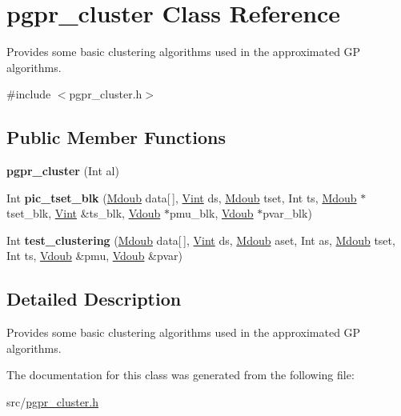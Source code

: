 \hypertarget{classpgpr__cluster}{\section{pgpr\-\_\-cluster Class Reference}
\label{classpgpr__cluster}
}


Provides some basic clustering algorithms used in the approximated G\-P algorithms.  




{\ttfamily \#include $<$pgpr\-\_\-cluster.\-h$>$}

\subsection*{Public Member Functions}
\begin{DoxyCompactItemize}
\item 
\hypertarget{classpgpr__cluster_abcc2777420420d1773d094ad9b5212b8}{{\bfseries pgpr\-\_\-cluster} (Int al)}\label{classpgpr__cluster_abcc2777420420d1773d094ad9b5212b8}

\item 
\hypertarget{classpgpr__cluster_aeceb942904a50b4b42942b012ec80e47}{Int {\bfseries pic\-\_\-tset\-\_\-blk} (\hyperlink{classpgpr__matrix}{Mdoub} data\mbox{[}$\,$\mbox{]}, \hyperlink{classpgpr__vector}{Vint} ds, \hyperlink{classpgpr__matrix}{Mdoub} tset, Int ts, \hyperlink{classpgpr__matrix}{Mdoub} $\ast$tset\-\_\-blk, \hyperlink{classpgpr__vector}{Vint} \&ts\-\_\-blk, \hyperlink{classpgpr__vector}{Vdoub} $\ast$pmu\-\_\-blk, \hyperlink{classpgpr__vector}{Vdoub} $\ast$pvar\-\_\-blk)}\label{classpgpr__cluster_aeceb942904a50b4b42942b012ec80e47}

\item 
\hypertarget{classpgpr__cluster_a0aa879c1cb4267c7a6632e9c21f4c5bd}{Int {\bfseries test\-\_\-clustering} (\hyperlink{classpgpr__matrix}{Mdoub} data\mbox{[}$\,$\mbox{]}, \hyperlink{classpgpr__vector}{Vint} ds, \hyperlink{classpgpr__matrix}{Mdoub} aset, Int as, \hyperlink{classpgpr__matrix}{Mdoub} tset, Int ts, \hyperlink{classpgpr__vector}{Vdoub} \&pmu, \hyperlink{classpgpr__vector}{Vdoub} \&pvar)}\label{classpgpr__cluster_a0aa879c1cb4267c7a6632e9c21f4c5bd}

\end{DoxyCompactItemize}


\subsection{Detailed Description}
Provides some basic clustering algorithms used in the approximated G\-P algorithms. 

The documentation for this class was generated from the following file\-:\begin{DoxyCompactItemize}
\item 
src/\hyperlink{pgpr__cluster_8h}{pgpr\-\_\-cluster.\-h}\end{DoxyCompactItemize}
